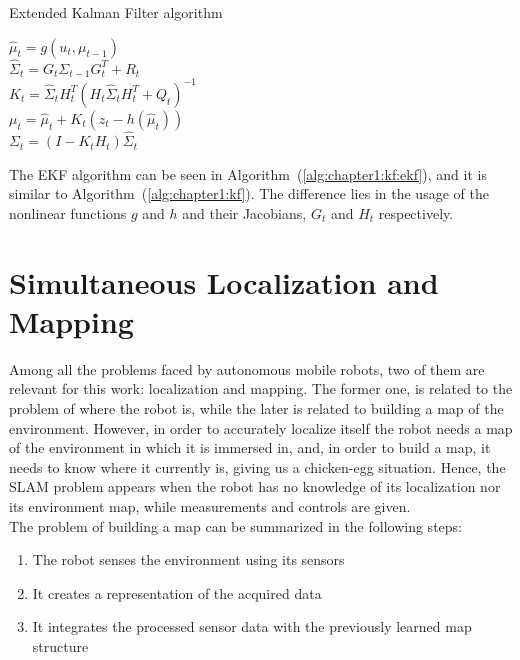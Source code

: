 \begin{algorithm}[h]
    \caption{Extended Kalman Filter algorithm}
    \label{alg:chapter1:kf:ekf}

    \BlankLine
    \BlankLine
    $\hat\mu_t = g \left(u_t, \mu_{t-1}\right)$ \\
    $\hat\Sigma_t = G_t \Sigma_{t-1} G_t^T + R_t$ \\
    \BlankLine
    $K_t = \hat\Sigma_t H_t^T \left(H_t \hat\Sigma_t H_t^T + Q_t\right)^{-1}$ \\
    $\mu_t = \hat\mu_t + K_t \left(z_t - h \left(\hat\mu_t\right) \right) $ \\
    $\Sigma_t = (I - K_t H_t) \hat\Sigma_t$ \\
    \BlankLine
\end{algorithm}

The \ac{EKF} algorithm can be seen in Algorithm~(\ref{alg:chapter1:kf:ekf}), and it is similar to Algorithm~(\ref{alg:chapter1:kf}). The difference lies in the usage of the nonlinear functions $g$ and $h$ and their Jacobians, $G_t$ and $H_t$ respectively.

\section{Simultaneous Localization and Mapping}
\label{sec:chapter1:slam}
Among all the problems faced by autonomous mobile robots, two of them are relevant for this work: localization and mapping. The former one, is related to the problem of where the robot is, while the later is related to building a map of the environment. However, in order to accurately localize itself the robot needs a map of the environment in which it is immersed in, and, in order to build a map, it needs to know where it currently is, giving us a chicken-egg situation. Hence, the \ac{SLAM} problem appears when the robot has no knowledge of its localization nor its environment map, while measurements and controls are given.\\

The problem of building a map can be summarized in the following steps:
\begin{enumerate}
    \item{The robot senses the environment using its sensors}
    \item{It creates a representation of the acquired data}
    \item{It integrates the processed sensor data with the previously learned map structure}
\end{enumerate}

